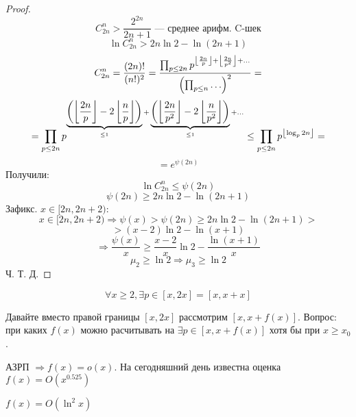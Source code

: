 \begin{proof}
\[
  C_{2n}^{n} > \frac{2^{2n}}{2n + 1} \text{ --- среднее арифм. C-шек}
\]
\[
  \ln C_{2n}^{n} > 2n \ln 2 - \ln(2n + 1)
\]
\[
  C_{2n}^{n} = \frac{(2n)!}{(n!)^{2}} = \frac{\prod_{p \leq 2n} p ^{\left\lfloor \frac{2n}{p} \right\rfloor + \left\lfloor \frac{2n}{p ^{2}} \right\rfloor + \ldots}}{\left(\prod_{p \leq n} \ldots\right)^{2}} = 
\]
\[
= \prod_{p \leq 2n} p ^{\underbrace{\left(\left\lfloor \frac{2n}{p} \right\rfloor - 2 \left\lfloor \frac{n}{p} \right\rfloor\right)}_{\leq 1} + \underbrace{\left(\left\lfloor \frac{2n}{p ^{2}} \right\rfloor - 2 \left\lfloor \frac{n}{p ^{2}} \right\rfloor\right)}_{\leq 1} + \ldots} \leq \prod_{p \leq 2n} p ^{\left\lfloor \log_p {2n} \right\rfloor} = 
\]
\[
 = e^{\psi(2n)} 
\]
Получили:
\[
  \ln C_{2n}^{n} \leq \psi(2n)
\]
\[
  \psi(2n) \geq 2n \ln 2 - \ln(2n + 1)
\]
Зафикс. $x \in [2n, 2n + 2)$:
\[
  x \in [2n, 2n + 2) \Rightarrow \psi(x) > \psi(2n) \geq 2n \ln 2 - \ln(2n + 1) > 
\]
\[
  > (x - 2)\ln 2 - \ln(x + 1)
\]
\[
  \Rightarrow \frac{\psi(x)}{x} \geq \frac{x - 2}{x} \ln 2 - \frac{\ln (x + 1)}{x}
\]
\[
  \mu_2 \geq \ln 2 \Rightarrow \mu_3 \geq \ln 2
\]
Ч. Т. Д. 
\end{proof}
\begin{theorem}
\label{theorem:04_3}
  \[
  \forall x \geq 2, \exists p \in [x, 2x] = [x, x + x]
  \]
\end{theorem}
Давайте вместо правой границы $[x, 2x]$ рассмотрим $[x, x + f(x)]$. Вопрос: при каких $f(x)$ можно расчитывать на $\exists p \in [x, x + f(x)]$ хотя бы при $x \geq x_0$.
\begin{note}
АЗРП $\Rightarrow f(x) = o(x)$. На сегодняшний день известна оценка $f(x) = O(x^{0.525})$
\end{note}
\begin{statement}[Гипотеза]
  $f(x) = O(\ln ^{2} x)$
\end{statement}

